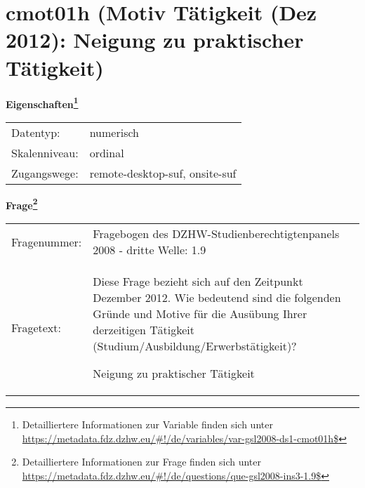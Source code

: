
    \setcounter{footnote}{0}

    \vspace*{-1.8cm}
	\section{cmot01h (Motiv Tätigkeit (Dez 2012): Neigung zu praktischer Tätigkeit)}
	\label{section:cmot01h}



    \vspace*{0.5cm}
    \noindent\textbf{Eigenschaften\footnote{Detailliertere Informationen zur Variable finden sich unter
		\url{https://metadata.fdz.dzhw.eu/\#!/de/variables/var-gsl2008-ds1-cmot01h$}}}\\
	\begin{tabularx}{\hsize}{@{}lX}
	Datentyp: & numerisch \\
	Skalenniveau: & ordinal \\
	Zugangswege: &
	  remote-desktop-suf, 
	  onsite-suf
 \\
    \end{tabularx}



				\vspace*{0.5cm}
                \noindent\textbf{Frage\footnote{Detailliertere Informationen zur Frage finden sich unter
		              \url{https://metadata.fdz.dzhw.eu/\#!/de/questions/que-gsl2008-ins3-1.9$}}}\\
				\begin{tabularx}{\hsize}{@{}lX}
					Fragenummer: &
					  Fragebogen des DZHW-Studienberechtigtenpanels 2008 - dritte Welle:
					  1.9
 \\
					Fragetext: & Diese Frage bezieht sich auf den Zeitpunkt Dezember 2012. Wie bedeutend sind die folgenden Gründe und Motive für die Ausübung Ihrer derzeitigen Tätigkeit (Studium/Ausbildung/Erwerbstätigkeit)?\par  Neigung zu praktischer Tätigkeit \\
				\end{tabularx}






